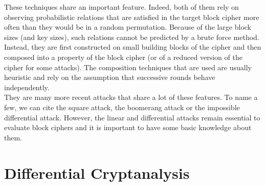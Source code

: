 	These techniques share an important feature. 
	Indeed, both of them rely on observing probabilistic relations that are satisfied in the target block cipher more often than they would be in a random permutation. 
	Because of the large block sizes (and key sizes), such relations cannot be predicted by a brute force method. 
	Instead, they are first constructed on small building blocks of the cipher and then composed into a property of the block cipher (or of a reduced version of the cipher for some attacks).
	The composition techniques that are used are usually heuristic and rely on the assumption that successive rounds behave independently.\\
	They are many more recent attacks that share a lot of these features. 
	To name a few, we can cite the square attack, the boomerang attack or the impossible differential attack. 
	However, the linear and differential attacks remain essential to evaluate block ciphers and it is important to have some basic knowledge about them.

\section{Differential Cryptanalysis}
